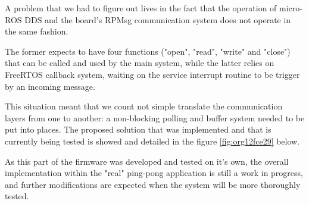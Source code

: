\documentclass[10pt]{article}
\begin{document}
A problem that we had to figure out lives in the fact that the operation of micro-ROS DDS
and the board's RPMsg communication system does not operate in the same fashion.

The former expects to have four functions ("open", "read", "write" and "close") that can
be called and used by the main system, while the latter relies on FreeRTOS callback
system, waiting on the service interrupt routine to be trigger by an incoming message.

This situation meant that we count not simple translate the communication layers from one
to another: a non-blocking polling and buffer system needed to be put into places.
The proposed solution that was implemented and that is currently being tested
is showed and detailed in the figure \ref{fig:org12fce29} below.

As this part of the firmware was developed and tested on it's own, the overall
implementation within the "real" ping-pong application is still a work in progress,
and further modifications are expected when the system will be more thoroughly tested.
\end{document}
